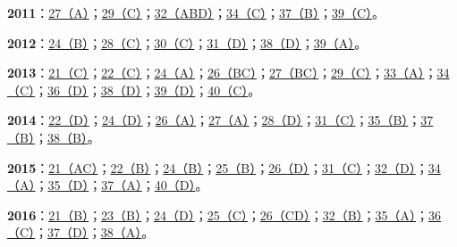 \documentclass[11pt,a4paper]{article}
\begin{document}
\noindent\textbf{2011}：\hyperref[idx-2011-T2-Q27]{27（A）}；\hyperref[idx-2011-T2-Q29]{29（C）}；\hyperref[idx-2011-T3-Q32]{32（ABD）}；\hyperref[idx-2011-T3-Q34]{34（C）}；\hyperref[idx-2011-T4-Q37]{37（B）}；\hyperref[idx-2011-T4-Q39]{39（C）}。\par
\noindent\textbf{2012}：\hyperref[idx-2012-T1-Q24]{24（B）}；\hyperref[idx-2012-T2-Q28]{28（C）}；\hyperref[idx-2012-T2-Q30]{30（C）}；\hyperref[idx-2012-T3-Q31]{31（D）}；\hyperref[idx-2012-T4-Q38]{38（D）}；\hyperref[idx-2012-T4-Q39]{39（A）}。\par
\noindent\textbf{2013}：\hyperref[idx-2013-T1-Q21]{21（C）}；\hyperref[idx-2013-T1-Q22]{22（C）}；\hyperref[idx-2013-T1-Q24]{24（A）}；\hyperref[idx-2013-T2-Q26]{26（BC）}；\hyperref[idx-2013-T2-Q27]{27（BC）}；\hyperref[idx-2013-T2-Q29]{29（C）}；\hyperref[idx-2013-T3-Q33]{33（A）}；\hyperref[idx-2013-T3-Q34]{34（C）}；\hyperref[idx-2013-T4-Q36]{36（D）}；\hyperref[idx-2013-T4-Q38]{38（D）}；\hyperref[idx-2013-T4-Q39]{39（D）}；\hyperref[idx-2013-T4-Q40]{40（C）}。\par
\noindent\textbf{2014}：\hyperref[idx-2014-T1-Q22]{22（D）}；\hyperref[idx-2014-T1-Q24]{24（D）}；\hyperref[idx-2014-T2-Q26]{26（A）}；\hyperref[idx-2014-T2-Q27]{27（A）}；\hyperref[idx-2014-T2-Q28]{28（D）}；\hyperref[idx-2014-T3-Q31]{31（C）}；\hyperref[idx-2014-T3-Q35]{35（B）}；\hyperref[idx-2014-T4-Q37]{37（B）}；\hyperref[idx-2014-T4-Q38]{38（B）}。\par
\noindent\textbf{2015}：\hyperref[idx-2015-T1-Q21]{21（AC）}；\hyperref[idx-2015-T1-Q22]{22（B）}；\hyperref[idx-2015-T1-Q24]{24（B）}；\hyperref[idx-2015-T1-Q25]{25（B）}；\hyperref[idx-2015-T2-Q26]{26（D）}；\hyperref[idx-2015-T3-Q31]{31（C）}；\hyperref[idx-2015-T3-Q32]{32（D）}；\hyperref[idx-2015-T3-Q34]{34（A）}；\hyperref[idx-2015-T3-Q35]{35（D）}；\hyperref[idx-2015-T4-Q37]{37（A）}；\hyperref[idx-2015-T4-Q40]{40（D）}。\par
\noindent\textbf{2016}：\hyperref[idx-2016-T1-Q21]{21（B）}；\hyperref[idx-2016-T1-Q23]{23（B）}；\hyperref[idx-2016-T1-Q24]{24（D）}；\hyperref[idx-2016-T1-Q25]{25（C）}；\hyperref[idx-2016-T2-Q26]{26（CD）}；\hyperref[idx-2016-T3-Q32]{32（B）}；\hyperref[idx-2016-T3-Q35]{35（A）}；\hyperref[idx-2016-T4-Q36]{36（C）}；\hyperref[idx-2016-T4-Q37]{37（D）}；\hyperref[idx-2016-T4-Q38]{38（A）}。\par
{}
\end{document}
